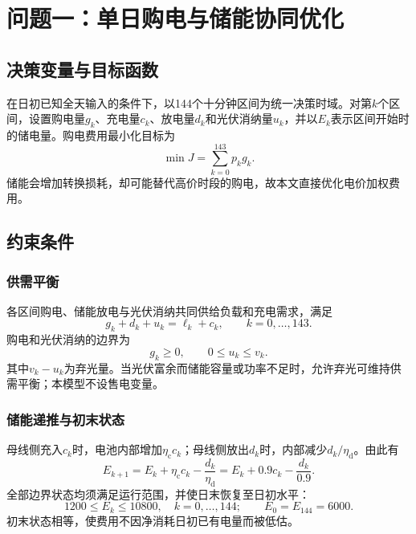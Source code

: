 \section{问题一：单日购电与储能协同优化}
\subsection{决策变量与目标函数}
在日初已知全天输入的条件下，以144个十分钟区间为统一决策时域。对第$k$个区间，设置购电量$g_k$、充电量$c_k$、放电量$d_k$和光伏消纳量$u_k$，并以$E_k$表示区间开始时的储电量。购电费用最小化目标为
\begin{equation}
  \min J=\sum_{k=0}^{143}p_kg_k.
  \label{eq:objective}
\end{equation}
储能会增加转换损耗，却可能替代高价时段的购电，故本文直接优化电价加权费用。

\subsection{约束条件}
\subsubsection{供需平衡}
各区间购电、储能放电与光伏消纳共同供给负载和充电需求，满足
\begin{equation}
  g_k+d_k+u_k=\ell_k+c_k,\qquad k=0,\ldots,143.
  \label{eq:balance}
\end{equation}
购电和光伏消纳的边界为
\begin{equation}
  g_k\ge0,\qquad 0\le u_k\le v_k.
  \label{eq:pv}
\end{equation}
其中$v_k-u_k$为弃光量。当光伏富余而储能容量或功率不足时，允许弃光可维持供需平衡；本模型不设售电变量。

\subsubsection{储能递推与初末状态}
母线侧充入$c_k$时，电池内部增加$\eta_{\mathrm c}c_k$；母线侧放出$d_k$时，内部减少$d_k/\eta_{\mathrm d}$。由此有
\begin{equation}
  E_{k+1}=E_k+\eta_{\mathrm c}c_k-\frac{d_k}{\eta_{\mathrm d}}
  =E_k+0.9c_k-\frac{d_k}{0.9}.
  \label{eq:state}
\end{equation}
全部边界状态均须满足运行范围，并使日末恢复至日初水平：
\begin{equation}
  1200\le E_k\le10800,\quad k=0,\ldots,144;
  \qquad E_0=E_{144}=6000.
  \label{eq:bounds}
\end{equation}
初末状态相等，使费用不因净消耗日初已有电量而被低估。

